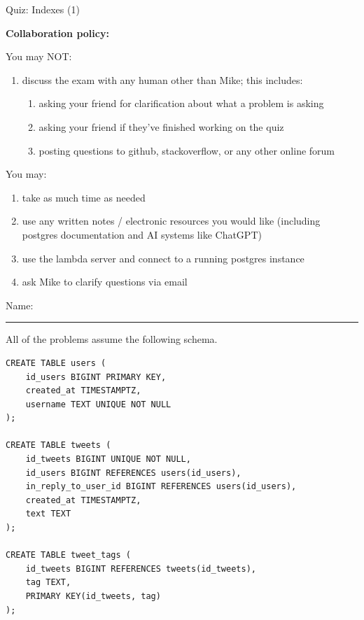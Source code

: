 \documentclass[12pt]{exam}
\theoremstyle{definition}
\begin{document}
\begin{center}
    {
\Large
    Quiz: Indexes (1)
}
\end{center}

\noindent
\textbf{Collaboration policy:} 

\vspace{0.1in}
\noindent
You may NOT:
\begin{enumerate}
    \item discuss the exam with any human other than Mike; this includes:
        \begin{enumerate}
            \item asking your friend for clarification about what a problem is asking
            \item asking your friend if they've finished working on the quiz
            \item posting questions to github, stackoverflow, or any other online forum
        \end{enumerate}
\end{enumerate}

\noindent
You may:
\begin{enumerate}
    \item take as much time as needed
    \item use any written notes / electronic resources you would like (including postgres documentation and AI systems like ChatGPT)
    \item use the lambda server and connect to a running postgres instance
    \item ask Mike to clarify questions via email
\end{enumerate}


\vspace{0.15in}

\vspace{0.25in}
\noindent
Name: 

\noindent
\rule{\textwidth}{0.1pt}
\vspace{0.15in}
\newpage



\noindent
All of the problems assume the following schema.
\begin{lstlisting}
CREATE TABLE users (
    id_users BIGINT PRIMARY KEY,
    created_at TIMESTAMPTZ,
    username TEXT UNIQUE NOT NULL
);

CREATE TABLE tweets (
    id_tweets BIGINT UNIQUE NOT NULL,
    id_users BIGINT REFERENCES users(id_users),
    in_reply_to_user_id BIGINT REFERENCES users(id_users),
    created_at TIMESTAMPTZ,
    text TEXT
);

CREATE TABLE tweet_tags (
    id_tweets BIGINT REFERENCES tweets(id_tweets),
    tag TEXT,
    PRIMARY KEY(id_tweets, tag)
);
\end{lstlisting}
\end{document}
